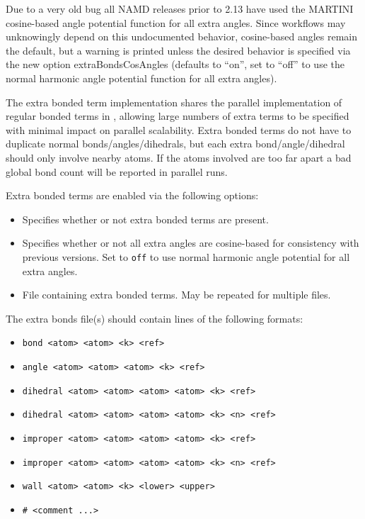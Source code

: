 Due to a very old bug all NAMD releases prior to 2.13 have used the
MARTINI cosine-based angle potential function for all extra angles.
Since workflows may unknowingly depend on this undocumented behavior,
cosine-based angles remain the default, but a warning is printed
unless the desired behavior is specified via the new option
extraBondsCosAngles (defaults to ``on'', set to ``off'' to use
the normal harmonic angle potential function for all extra angles).

The extra bonded term implementation shares the parallel implementation
of regular bonded terms in \NAMD, allowing large numbers of extra terms
to be specified with minimal impact on parallel scalability.
Extra bonded terms do not have to duplicate normal bonds/angles/dihedrals,
but each extra bond/angle/dihedral should only involve nearby atoms.
If the atoms involved are too far apart a bad global bond count will be
reported in parallel runs.

Extra bonded terms are enabled via the following options:

\begin{itemize}

\item
{}
{Specifies whether or not extra bonded terms are present.} 

\item
{}
{Specifies whether or not all extra angles are cosine-based for consistency with previous versions.
Set to {\tt off} to use normal harmonic angle potential for all extra angles.} 

\item
{}
{File containing extra bonded terms.  May be repeated for multiple files.} 

\end{itemize}

The extra bonds file(s) should contain lines of the following formats:

\begin{itemize}
\item
{\tt bond <atom> <atom> <k> <ref>}
\item
{\tt angle <atom> <atom> <atom> <k> <ref>}
\item
{\tt dihedral <atom> <atom> <atom> <atom> <k> <ref>}
\item
{\tt dihedral <atom> <atom> <atom> <atom> <k> <n> <ref>}
\item
{\tt improper <atom> <atom> <atom> <atom> <k> <ref>}
\item
{\tt improper <atom> <atom> <atom> <atom> <k> <n> <ref>}
\item
{\tt wall <atom> <atom> <k> <lower> <upper>}
\item
{\tt \# <comment ...>}
\end{itemize}

